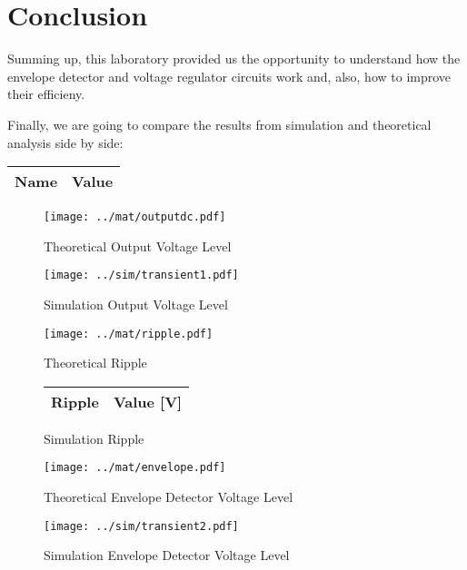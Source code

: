\section{Conclusion}
\label{sec:conclusion}

Summing up, this laboratory provided us the opportunity to understand how the envelope detector and voltage regulator circuits work and, also, how to improve their efficieny.\par
Finally, we are going to compare the results from simulation and theoretical analysis side by side: \par

\begin{center}
  \begin{tabular}{ | c | c | }
    \hline    
    {\bf Name} & {\bf Value} \\ \hline
    
    \hline
  \end{tabular}
\end{center}

\begin{figure}[H]
      \texttt{[image: ../mat/outputdc.pdf]}
      \caption{Theoretical Output Voltage Level}
    \endminipage\hfill
      \texttt{[image: ../sim/transient1.pdf]}
      \caption{Simulation Output Voltage Level}
    \endminipage\hfill
\end{figure}

\begin{figure}[H]
      \texttt{[image: ../mat/ripple.pdf]}
      \caption{Theoretical Ripple}
    \endminipage\hfill
      \centering
      \begin{tabular}{ | c | c | }
      \hline    
      {\bf Ripple} & {\bf Value [V]} \\ \hline
      
      \end{tabular}
      \caption{Simulation Ripple}
    \endminipage\hfill
\end{figure}

\begin{figure}[H]
      \texttt{[image: ../mat/envelope.pdf]}
      \caption{Theoretical Envelope Detector Voltage Level}
    \endminipage\hfill
      \texttt{[image: ../sim/transient2.pdf]}
      \caption{Simulation Envelope Detector Voltage Level}
    \endminipage\hfill
\end{figure}

